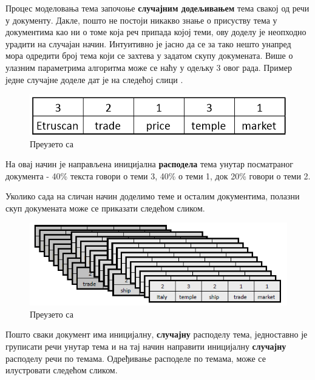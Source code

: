 Процес моделовања тема започоње \textbf{случајним додељивањем} тема свакој од речи у документу. Дакле, пошто не постоји никакво знање о присуству тема у документима као ни о томе која реч припада којој теми, ову доделу је неопходно урадити на случајан начин. Интуитивно је јасно да се за тако нешто унапред мора одредити број тема који се захтева у задатом скупу докумената. Више о улазним параметрима алгоритма може се наћу у одељку 3 овог рада.
Пример једне случајне доделе дат је на следећој слици .
\begin{figure}[H]
    \centering
   \includegraphics[scale=0.6]{./Slike/slika4.png} 
	\caption{Преузето са \cite{mimno1}}
	\label{fig:slika4}
\end{figure}

На овај начин је направљена иницијална \textbf{расподела} тема унутар посматраног документа - 40\% текста говори о теми 3, 40\% о теми 1, док 20\% говори о теми 2.

Уколико сада на сличан начин доделимо теме и осталим документима, полазни скуп докумената може се приказати следећом сликом.

\begin{figure}[H]
    \centering
   \includegraphics[scale=0.6]{./Slike/slika5.png} 
	\caption{Преузето са \cite{mimno1}}
	\label{fig:slika5}
\end{figure}

Пошто сваки документ има иницијалну, \textbf{случајну} расподелу тема, једноставно је груписати речи унутар тема и на тај начин направити иницијалну \textbf{случајну} расподелу речи по темама. Одређивање расподеле по темама, може се илустровати следећом сликом.



